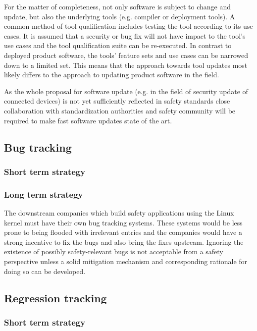 \documentclass[12pt]{ElisaPaper}
\begin{document}
For the matter of completeness, not only software is subject to change and update, but also the underlying tools (e.g. compiler or deployment tools). 
A common method of tool qualification includes testing the tool according to its use cases. 
It is assumed that a security or bug fix will not have impact to the tool's use cases and 
the tool qualification suite can be re-executed. 
In contrast to deployed product software, 
the tools' feature sets and use cases can be narrowed down to a limited set. 
This means that the approach towards tool updates most likely differs to the approach to updating product software in the field.

As the whole proposal for software update (e.g. in the field of security update of connected devices) 
is not yet sufficiently reflected in safety standards 
close collaboration with standardization authorities and safety community 
will be required to make fast software updates state of the art.
\subsection{Bug tracking}

\subsubsection{Short term strategy}

\subsubsection{Long term strategy}
The downstream companies which build safety applications using the Linux kernel must have their own bug tracking systems.
These systems would be less prone to being flooded with irrelevant entries and 
the companies would have a strong incentive to fix the bugs and also bring the fixes upstream. 
Ignoring the existence of possibly safety-relevant bugs is not acceptable from a safety perspective 
unless a solid mitigation mechanism and corresponding rationale for doing so can be developed.

\subsection{Regression tracking}
\subsubsection{Short term strategy}
\end{document}
